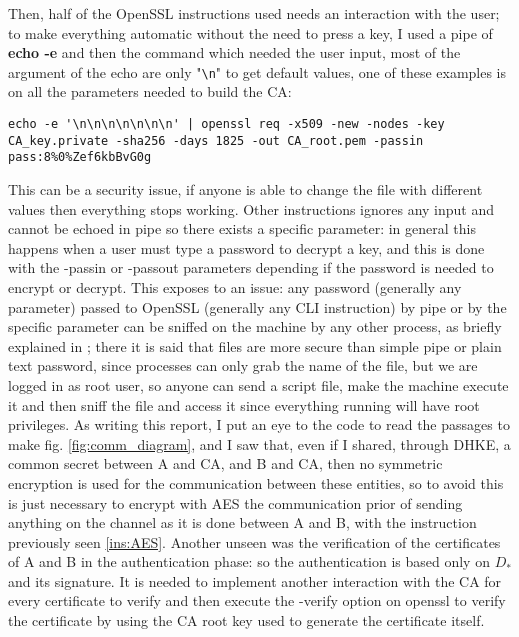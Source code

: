 \documentclass{article}
\begin{document}
Then, half of the OpenSSL instructions used needs an interaction with the user; to make everything automatic without the need to press a key, I used a pipe of \textbf{echo -e} and then the command which needed the user input, most of the argument of the echo are only "\verb|\n|" to get default values, one of these examples is on all the parameters needed to build the CA:

\begin{lstlisting}[breaklines]
echo -e '\n\n\n\n\n\n\n' | openssl req -x509 -new -nodes -key CA_key.private -sha256 -days 1825 -out CA_root.pem -passin pass:8%0%Zef6kbBvG0g
\end{lstlisting}

This can be a security issue, if anyone is able to change the file with different values then everything stops working. Other instructions ignores any input and cannot be echoed in pipe so there exists a specific parameter: in general this happens when a user must type a password to decrypt a key, and this is done with the -passin or -passout parameters depending if the password is needed to encrypt or decrypt. This exposes to an issue: any password (generally any parameter) passed to OpenSSL (generally any CLI instruction) by pipe or by the specific parameter can be sniffed on the machine by any other process, as briefly explained in \cite{password}; there it is said that files are more secure than simple pipe or plain text password, since processes can only grab the name of the file, but we are logged in as root user, so anyone can send a script file, make the machine execute it and then sniff the file and access it since everything running will have root privileges.\newline
As writing this report, I put an eye to the code to read the passages to make fig. \ref{fig:comm_diagram}, and I saw that, even if I shared, through DHKE, a common secret between A and CA, and B and CA, then no symmetric encryption is used for the communication between these entities, so to avoid this is just necessary to encrypt with AES the communication prior of sending anything on the channel as it is done between A and B, with the instruction previously seen \ref{ins:AES}.\newline
Another unseen was the verification of the certificates of A and B in the authentication phase: so the authentication is based only on $D_*$ and its signature. It is needed to implement another interaction with the CA for every certificate to verify and then execute the -verify option on openssl to verify the certificate by using the CA root key used to generate the certificate itself.\newline
\end{document}
